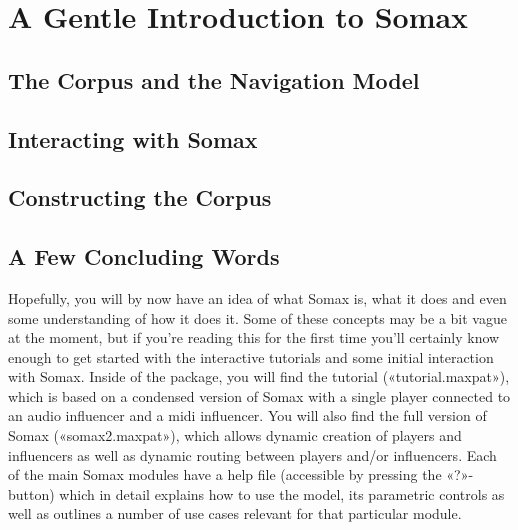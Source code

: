 \documentclass[11pt,a4paper]{report}
\begin{document}
\thispagestyle{empty}


\section*{A Gentle Introduction to Somax}




\subsection*{The Corpus and the Navigation Model}


\subsection*{Interacting with Somax}


\subsection*{Constructing the Corpus}

\pagebreak

\subsection*{A Few Concluding Words}
Hopefully, you will by now have an idea of what Somax is, what it does and even some understanding of how it does it. Some of these concepts may be a bit vague at the moment, but if you're reading this for the first time you'll certainly know enough to get started with the interactive tutorials and some initial interaction with Somax. Inside of the package, you will find the tutorial («tutorial.maxpat»), which is based on a condensed version of Somax with a single player connected to an audio influencer and a midi influencer. You will also find the full version of Somax («somax2.maxpat»), which allows dynamic creation of players and influencers as well as dynamic routing between players and/or influencers. Each of the main Somax modules have a help file (accessible by pressing the «?»-button) which in detail explains how to use the model, its parametric controls as well as outlines a number of use cases relevant for that particular module. 
\end{document}
